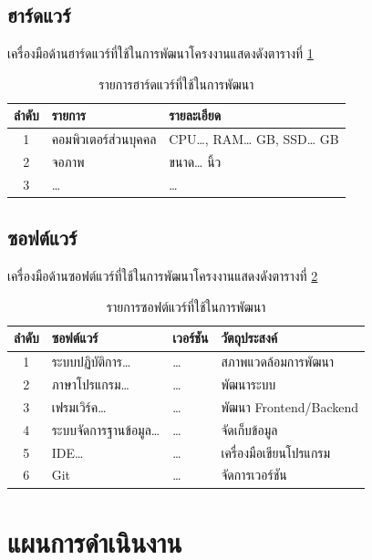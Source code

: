 \subsection{ฮาร์ดแวร์}

เครื่องมือด้านฮาร์ดแวร์ที่ใช้ในการพัฒนาโครงงานแสดงดังตารางที่ \ref{tab:hardware}

\begin{table}[H]
\centering
\caption{รายการฮาร์ดแวร์ที่ใช้ในการพัฒนา}
\label{tab:hardware}
\begin{tabular}{|c|l|l|}
\hline
\textbf{ลำดับ} & \textbf{รายการ} & \textbf{รายละเอียด} \\
\hline
1 & คอมพิวเตอร์ส่วนบุคคล & CPU\ldots{}, RAM\ldots{} GB, SSD\ldots{} GB \\ \hline
2 & จอภาพ & ขนาด\ldots{} นิ้ว \\ \hline
3 & \ldots & \ldots \\
\hline
\end{tabular}
\end{table}

\subsection{ซอฟต์แวร์}

เครื่องมือด้านซอฟต์แวร์ที่ใช้ในการพัฒนาโครงงานแสดงดังตารางที่ \ref{tab:software}

\begin{table}[H]
\centering
\caption{รายการซอฟต์แวร์ที่ใช้ในการพัฒนา}
\label{tab:software}
\begin{tabular}{|c|l|l|l|}
\hline
\textbf{ลำดับ} & \textbf{ซอฟต์แวร์} & \textbf{เวอร์ชัน} & \textbf{วัตถุประสงค์} \\
\hline
1 & ระบบปฏิบัติการ\ldots & \ldots & สภาพแวดล้อมการพัฒนา \\ \hline
2 & ภาษาโปรแกรม\ldots & \ldots & พัฒนาระบบ \\ \hline
3 & เฟรมเวิร์ค\ldots & \ldots & พัฒนา Frontend/Backend \\ \hline
4 & ระบบจัดการฐานข้อมูล\ldots & \ldots & จัดเก็บข้อมูล \\ \hline
5 & IDE\ldots & \ldots & เครื่องมือเขียนโปรแกรม \\ \hline
6 & Git & \ldots & จัดการเวอร์ชัน \\
\hline
\end{tabular}
\end{table}

\section{แผนการดำเนินงาน}

